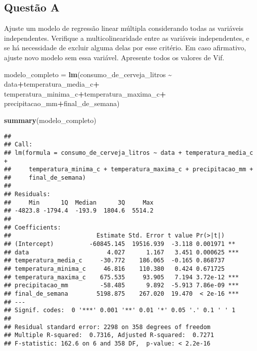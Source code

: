 \documentclass[
]{article}
\newenvironment{Shaded}{\begin{snugshade}}{\end{snugshade}}
\newcommand{\FunctionTok}[1]{\textcolor[rgb]{0.13,0.29,0.53}{\textbf{#1}}}
\newcommand{\NormalTok}[1]{#1}
\newcommand{\OtherTok}[1]{\textcolor[rgb]{0.56,0.35,0.01}{#1}}
\newcommand{\SpecialCharTok}[1]{\textcolor[rgb]{0.81,0.36,0.00}{\textbf{#1}}}
\begin{document}
\hypertarget{questuxe3o-a}{%
\subsection{Questão A}\label{questuxe3o-a}}

Ajuste um modelo de regressão linear múltipla considerando todas as
variáveis independentes. Verifique a multicolinearidade entre as
variáveis independentes, e se há necessidade de excluir alguma delas por
esse critério. Em caso afirmativo, ajuste novo modelo sem essa variável.
Apresente todos os valores de Vif.

\begin{Shaded}
\begin{Highlighting}[]
\NormalTok{modelo\_completo }\OtherTok{=} \FunctionTok{lm}\NormalTok{(consumo\_de\_cerveja\_litros }\SpecialCharTok{\textasciitilde{}}\NormalTok{ data}\SpecialCharTok{+}\NormalTok{temperatura\_media\_c}\SpecialCharTok{+}
\NormalTok{                       temperatura\_minima\_c}\SpecialCharTok{+}\NormalTok{temperatura\_maxima\_c}\SpecialCharTok{+}
\NormalTok{                       precipitacao\_mm}\SpecialCharTok{+}\NormalTok{final\_de\_semana)}

\FunctionTok{summary}\NormalTok{(modelo\_completo)}
\end{Highlighting}
\end{Shaded}

\begin{verbatim}
## 
## Call:
## lm(formula = consumo_de_cerveja_litros ~ data + temperatura_media_c + 
##     temperatura_minima_c + temperatura_maxima_c + precipitacao_mm + 
##     final_de_semana)
## 
## Residuals:
##     Min      1Q  Median      3Q     Max 
## -4823.8 -1794.4  -193.9  1804.6  5514.2 
## 
## Coefficients:
##                        Estimate Std. Error t value Pr(>|t|)    
## (Intercept)          -60845.145  19516.939  -3.118 0.001971 ** 
## data                      4.027      1.167   3.451 0.000625 ***
## temperatura_media_c     -30.772    186.065  -0.165 0.868737    
## temperatura_minima_c     46.816    110.380   0.424 0.671725    
## temperatura_maxima_c    675.535     93.905   7.194 3.72e-12 ***
## precipitacao_mm         -58.485      9.892  -5.913 7.86e-09 ***
## final_de_semana        5198.875    267.020  19.470  < 2e-16 ***
## ---
## Signif. codes:  0 '***' 0.001 '**' 0.01 '*' 0.05 '.' 0.1 ' ' 1
## 
## Residual standard error: 2298 on 358 degrees of freedom
## Multiple R-squared:  0.7316, Adjusted R-squared:  0.7271 
## F-statistic: 162.6 on 6 and 358 DF,  p-value: < 2.2e-16
\end{verbatim}
\end{document}
